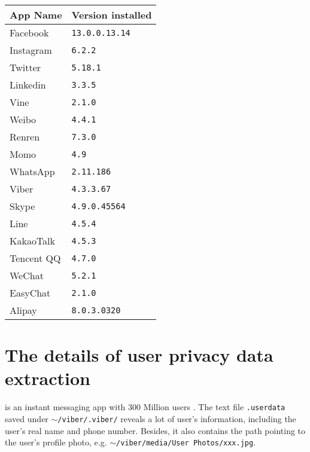 \documentclass{sig-alternate}
\begin{document}
\begin{table}[htb]
\centering
\newsavebox{\tableboxa}
\label{applist}
\begin{lrbox}{\tableboxa}
\begin{tabular}{l|l} \hline

\textbf{App Name} &\textbf{Version installed}\\ \hline



Facebook &\texttt{13.0.0.13.14}  \\ \hline
Instagram&\texttt{6.2.2}\\ \hline
Twitter  &\texttt{5.18.1}\\ \hline
Linkedin &\texttt{3.3.5}\\ \hline
Vine &\texttt{2.1.0}\\ \hline
Weibo &\texttt{4.4.1}  \\ \hline
Renren & \texttt{7.3.0}\\ \hline
Momo& \texttt{4.9} \\ \hline
WhatsApp &\texttt{2.11.186}\\ \hline
Viber &\texttt{4.3.3.67} \\ \hline
Skype &\texttt{4.9.0.45564}\\ \hline
Line & \texttt{4.5.4} \\ \hline
KakaoTalk &\texttt{4.5.3}\\ \hline
Tencent QQ & \texttt{4.7.0}\\ \hline
WeChat& \texttt{5.2.1}\\ \hline
EasyChat& \texttt{2.1.0}\\ \hline
Alipay &\texttt{8.0.3.0320}\\ \hline

\end{tabular}
\end{lrbox}
\scalebox{0.85}{\usebox{\tableboxa}}
\end{table}



\section{The details of user privacy data extraction }
\label{appendix2}


 is an instant messaging app with 300 Million users \cite{10MessagingApps}. The text file \texttt{.userdata} saved under \texttt{$\sim$/viber/.viber/} reveals a lot of user's information, including the user's real name and phone number. Besides, it also contains the path pointing to the user's profile photo, e.g. \texttt{$\sim$/viber/media/User Photos/xxx.jpg}.
\end{document}
